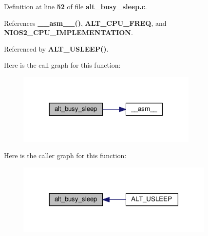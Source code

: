 Definition at line {\bf 52} of file {\bf alt\+\_\+busy\+\_\+sleep.\+c}.



References {\bf \+\_\+\+\_\+asm\+\_\+\+\_\+()}, {\bf A\+L\+T\+\_\+\+C\+P\+U\+\_\+\+F\+R\+EQ}, and {\bf N\+I\+O\+S2\+\_\+\+C\+P\+U\+\_\+\+I\+M\+P\+L\+E\+M\+E\+N\+T\+A\+T\+I\+ON}.



Referenced by {\bf A\+L\+T\+\_\+\+U\+S\+L\+E\+E\+P()}.



Here is the call graph for this function\+:
\nopagebreak
\begin{figure}[H]
\begin{center}
\leavevmode
\includegraphics[width=254pt]{df/db4/alt__busy__sleep_8h_af6fb083bb6e8961a3704e558dd493ac2_cgraph}
\end{center}
\end{figure}




Here is the caller graph for this function\+:
\nopagebreak
\begin{figure}[H]
\begin{center}
\leavevmode
\includegraphics[width=278pt]{df/db4/alt__busy__sleep_8h_af6fb083bb6e8961a3704e558dd493ac2_icgraph}
\end{center}
\end{figure}


